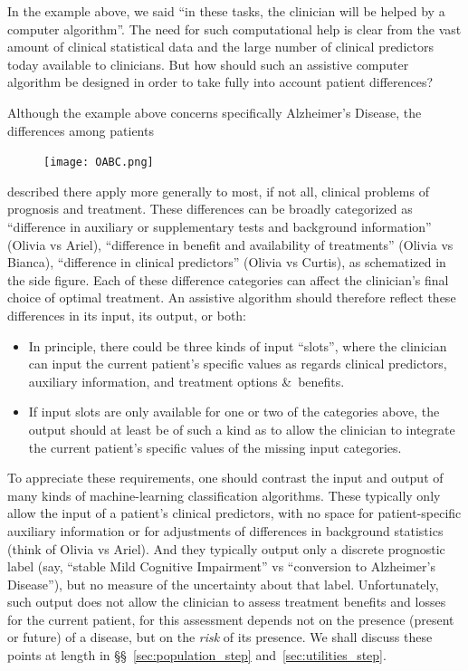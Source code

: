 \documentclass[utf8]{FrontiersinHarvard_mod} %
\newcommand*{\pencil}{{\fontencoding{U}\fontfamily{fontawesometwo}\selectfont\symbol{210}}}
\newcommand{\mynotep}[1]{{\color{notecolour}\pencil\ #1}}
\newcommand*{\amp}{\&}
\newcommand*{\sects}{\S\S}%
\renewcommand*{\|}[1][]{\nonscript\:#1\vert\nonscript\:\mathopen{}}
\newcommand*{\ad}{Alzheimer's Disease}
\newcommand*{\mci}{Mild Cognitive Impairment}
\begin{document}
In the example above, we said \enquote{in these tasks, the clinician will be helped by a computer algorithm}. The need for such computational help is clear from the vast amount of clinical statistical data and the large number of clinical predictors today available to clinicians. But how should such an assistive computer algorithm be designed in order to take fully into account patient differences?

Although the example above concerns specifically \ad, the differences among patients
\begin{figure}%
\vspace{-1.5em}%
\texttt{[image: OABC.png]}%
\vspace{-2em}%
\end{figure}
described there apply more generally to most, if not all, clinical problems of prognosis and treatment. These differences can be broadly categorized as \enquote{difference in auxiliary or supplementary tests  and background information} (Olivia vs Ariel), \enquote{difference in benefit and availability of treatments} (Olivia vs Bianca), \enquote{difference in clinical predictors} (Olivia vs Curtis), as schematized in the side figure. Each of these difference categories can affect the clinician's final choice of optimal treatment. An assistive algorithm should therefore reflect these differences in its input, its output, or both:
\begin{itemize}
\item In principle, there could be three kinds of input \enquote{slots}, where the clinician can input the current patient's specific values as regards clinical predictors, auxiliary information, and treatment options \amp\ benefits.
\item If input slots are only available for one or two of the categories above, the output should at least be of such a kind as to allow the clinician to integrate the current patient's specific values of the missing input categories.
\end{itemize}

To appreciate these requirements, one should contrast the input and output of many kinds of machine-learning classification algorithms. These typically only allow the input of a patient's clinical predictors, with no space for patient-specific auxiliary information or for adjustments of differences in background statistics (think of Olivia vs Ariel). And they typically output only a discrete prognostic label (say, \enquote{stable \mci} vs \enquote{conversion to \ad}), but no measure of the uncertainty about that label. Unfortunately, such output does not allow the clinician to assess treatment benefits and losses for the current patient, for this assessment depends not on the presence (present or future) of a disease, but on the \emph{risk} of its presence. We shall discuss these points at length in \sects~\ref{sec:population_step} and~\ref{sec:utilities_step}.
\end{document}
